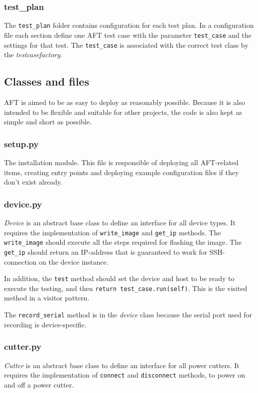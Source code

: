 \documentclass[a4paper,11pt]{article}
\newcommand{\cmd}[1]{\texttt{#1}}
\begin{document}
\subsubsection*{test\_plan}
The \cmd{test\_plan} folder contains configuration for each test plan. In a configuration file each section define one AFT test case with the parameter \cmd{test\_case} and the settings for that test. The \cmd{test\_case} is associated with the correct test class by the \emph{testcasefactory}.

\subsection{Classes and files}

AFT is aimed to be as easy to deploy as reasonably possible. Because it is also intended to be flexible and suitable for other projects, the code is also kept as simple and short as possible.

\subsubsection*{setup.py}
The installation module. This file is responsible of deploying all AFT-related items, creating entry points and deploying example configuration files if they don't exist already.

\subsubsection*{device.py}
\emph{Device} is an abstract base class to define an interface for all device types. It requires the implementation of \cmd{write\_image} and \cmd{get\_ip} methods. The \cmd{write\_image} should execute all the steps required for flashing the image. The \cmd{get\_ip} should return an IP-address that is guaranteed to work for SSH-connection on the device instance.

In addition, the \cmd{test} method should set the device and host to be ready to execute the testing, and then \cmd{return test\_case.run(self)}. This is the visited method in a visitor pattern.

The \cmd{record\_serial} method is in the \emph{device} class because the serial port used for recording is device-specific.

\subsubsection*{cutter.py}
\emph{Cutter} is an abstract base class to define an interface for all power cutters. It requires the implementation of \cmd{connect} and \cmd{disconnect} methods, to power on and off a power cutter.
\end{document}
